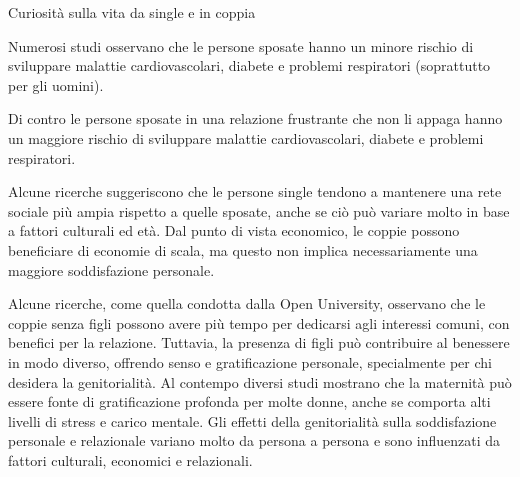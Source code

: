 \documentclass[12pt]{book} %
\begin{document}
\begin{mdframed}[linewidth=1pt]
Curiosità sulla vita da single e in coppia

Numerosi studi osservano che le persone sposate hanno un minore rischio di sviluppare malattie cardiovascolari, diabete
e problemi respiratori (soprattutto per gli uomini).

Di contro le persone sposate in una relazione frustrante che non li appaga hanno un maggiore rischio di sviluppare
malattie cardiovascolari, diabete e problemi respiratori.

Alcune ricerche suggeriscono che le persone single tendono a mantenere una rete sociale più ampia rispetto a quelle sposate, anche se ciò può variare molto in base a fattori culturali ed età. Dal punto di vista economico, le coppie possono beneficiare di economie di scala, ma questo non implica necessariamente una maggiore soddisfazione personale.

Alcune ricerche, come quella condotta dalla Open University, osservano che le coppie senza figli possono avere più tempo per dedicarsi agli interessi comuni, con benefici per la relazione. Tuttavia, la presenza di figli può contribuire al benessere in modo diverso, offrendo senso e gratificazione personale, specialmente per chi desidera la genitorialità. Al contempo diversi studi mostrano che la maternità può essere fonte di gratificazione profonda per molte donne, anche se comporta alti livelli di stress e carico mentale. Gli effetti della genitorialità sulla soddisfazione personale e relazionale variano molto da persona a persona e sono influenzati da fattori culturali, economici e relazionali.
\end{mdframed}
\end{document}
